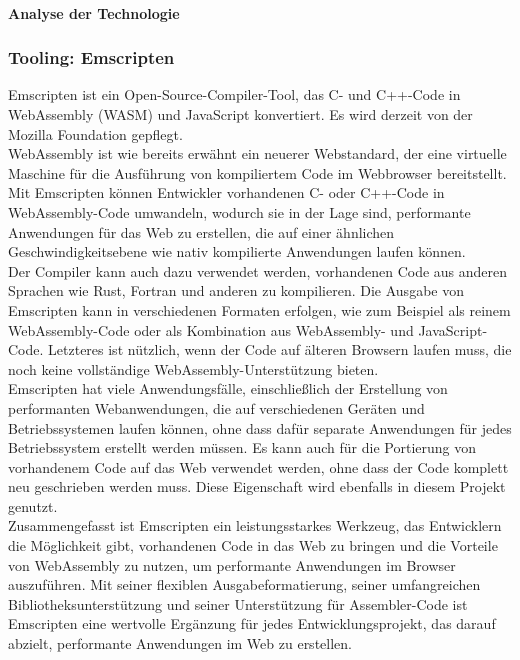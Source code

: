 \paragraph*{Analyse der Technologie}

\subsubsection{Tooling: Emscripten}
Emscripten ist ein Open-Source-Compiler-Tool, das C- und C++-Code in WebAssembly (WASM) und JavaScript konvertiert. Es wird derzeit von der Mozilla Foundation gepflegt. \\
WebAssembly ist wie bereits erwähnt ein neuerer Webstandard, der eine virtuelle Maschine für die Ausführung von kompiliertem Code im Webbrowser bereitstellt. Mit Emscripten können Entwickler vorhandenen C- oder C++-Code in WebAssembly-Code umwandeln, wodurch sie in der Lage sind, performante Anwendungen für das Web zu erstellen, die auf einer ähnlichen Geschwindigkeitsebene wie nativ kompilierte Anwendungen laufen können. \\
Der Compiler kann auch dazu verwendet werden, vorhandenen Code aus anderen Sprachen wie Rust, Fortran und anderen zu kompilieren. Die Ausgabe von Emscripten kann in verschiedenen Formaten erfolgen, wie zum Beispiel als reinem WebAssembly-Code oder als Kombination aus WebAssembly- und JavaScript-Code. Letzteres ist nützlich, wenn der Code auf älteren Browsern laufen muss, die noch keine vollständige WebAssembly-Unterstützung bieten. \\
Emscripten hat viele Anwendungsfälle, einschließlich der Erstellung von performanten Webanwendungen, die auf verschiedenen Geräten und Betriebssystemen laufen können, ohne dass dafür separate Anwendungen für jedes Betriebssystem erstellt werden müssen. Es kann auch für die Portierung von vorhandenem Code auf das Web verwendet werden, ohne dass der Code komplett neu geschrieben werden muss. Diese Eigenschaft wird ebenfalls in diesem Projekt genutzt. \\
Zusammengefasst ist Emscripten ein leistungsstarkes Werkzeug, das Entwicklern die Möglichkeit gibt, vorhandenen Code in das Web zu bringen und die Vorteile von WebAssembly zu nutzen, um performante Anwendungen im Browser auszuführen. Mit seiner flexiblen Ausgabeformatierung, seiner umfangreichen Bibliotheksunterstützung und seiner Unterstützung für Assembler-Code ist Emscripten eine wertvolle Ergänzung für jedes Entwicklungsprojekt, das darauf abzielt, performante Anwendungen im Web zu erstellen. \\
\cite*{emscriptenwebsite}
